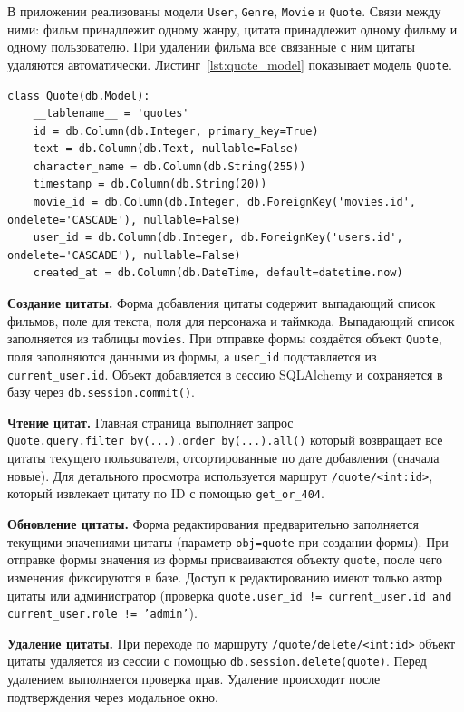 В приложении реализованы модели \texttt{User}, \texttt{Genre}, \texttt{Movie} и 
\texttt{Quote}. Связи между ними: фильм принадлежит одному жанру, цитата принадлежит 
одному фильму и одному пользователю. При удалении фильма все связанные с ним цитаты 
удаляются автоматически. Листинг~\ref{lst:quote_model} показывает модель \texttt{Quote}.

\begin{lstlisting}[caption={Модель цитаты (models.py)}, label={lst:quote_model}]
class Quote(db.Model):
    __tablename__ = 'quotes'
    id = db.Column(db.Integer, primary_key=True)
    text = db.Column(db.Text, nullable=False)
    character_name = db.Column(db.String(255))
    timestamp = db.Column(db.String(20))
    movie_id = db.Column(db.Integer, db.ForeignKey('movies.id', ondelete='CASCADE'), nullable=False)
    user_id = db.Column(db.Integer, db.ForeignKey('users.id', ondelete='CASCADE'), nullable=False)
    created_at = db.Column(db.DateTime, default=datetime.now)
\end{lstlisting}

\textbf{Создание цитаты.} Форма добавления цитаты содержит выпадающий список фильмов, 
поле для текста, поля для персонажа и таймкода. Выпадающий список заполняется из таблицы 
\texttt{movies}. При отправке формы создаётся объект \texttt{Quote}, поля заполняются 
данными из формы, а \texttt{user\_id} подставляется из \texttt{current\_user.id}. Объект 
добавляется в сессию SQLAlchemy и сохраняется в базу через \texttt{db.session.commit()}. 

\textbf{Чтение цитат.} Главная страница выполняет запрос 
\texttt{\texttt{Quote.query.filter\-\_by(...).order\_by(...).all()}}
который возвращает все цитаты текущего пользователя, отсортированные по дате добавления 
(сначала новые). Для детального просмотра используется маршрут \texttt{/quote/<int:id>}, 
который извлекает цитату по ID с помощью \texttt{get\_or\_404}.

\textbf{Обновление цитаты.} Форма редактирования предварительно заполняется текущими 
значениями цитаты (параметр \texttt{obj=quote} при создании формы). При отправке формы 
значения из формы присваиваются объекту \texttt{quote}, после чего изменения фиксируются 
в базе. Доступ к редактированию имеют только автор цитаты или администратор 
(проверка \texttt{quote.user\_id != current\_user.id and current\_user.role != 'admin'}).

\textbf{Удаление цитаты.} При переходе по маршруту \texttt{/quote/delete/<int:id>} объект 
цитаты удаляется из сессии с помощью \texttt{db.session.delete(quote)}. Перед удалением 
выполняется проверка прав. Удаление происходит после подтверждения через модальное окно.

